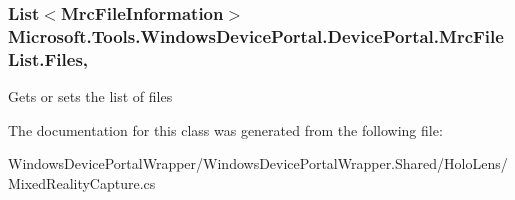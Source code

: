 \subsubsection[{\texorpdfstring{Files}{Files}}]{\setlength{\rightskip}{0pt plus 5cm}List$<${\bf Mrc\+File\+Information}$>$ Microsoft.\+Tools.\+Windows\+Device\+Portal.\+Device\+Portal.\+Mrc\+File\+List.\+Files\hspace{0.3cm}{\ttfamily [get]}, {\ttfamily [set]}}\hypertarget{class_microsoft_1_1_tools_1_1_windows_device_portal_1_1_device_portal_1_1_mrc_file_list_a0f075ad650ee920fd45c40cae6d71804}{}\label{class_microsoft_1_1_tools_1_1_windows_device_portal_1_1_device_portal_1_1_mrc_file_list_a0f075ad650ee920fd45c40cae6d71804}


Gets or sets the list of files 



The documentation for this class was generated from the following file\+:\begin{DoxyCompactItemize}
\item 
Windows\+Device\+Portal\+Wrapper/\+Windows\+Device\+Portal\+Wrapper.\+Shared/\+Holo\+Lens/Mixed\+Reality\+Capture.\+cs\end{DoxyCompactItemize}
